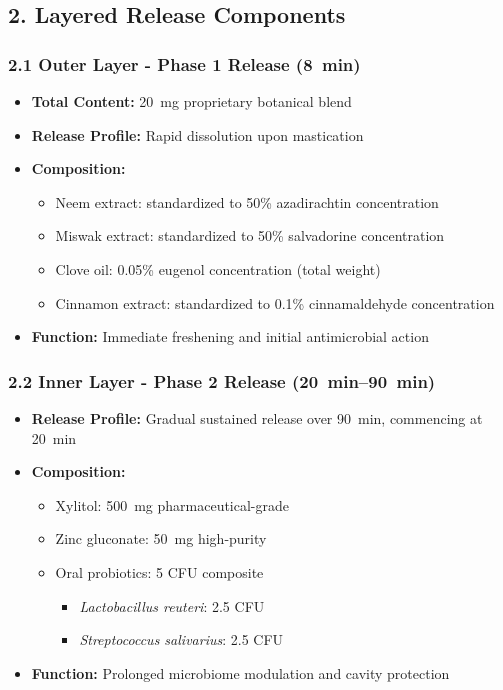 \documentclass[12pt]{article}
\begin{document}
\subsection*{2. Layered Release Components}

\subsubsection*{2.1 Outer Layer - Phase 1 Release (\SI{8}{\minute})}
\begin{itemize}
    \item \textbf{Total Content:} \SI{20}{\milli\gram} proprietary botanical blend
    \item \textbf{Release Profile:} Rapid dissolution upon mastication
    \item \textbf{Composition:}
    \begin{itemize}
        \item Neem extract: standardized to 50\% azadirachtin concentration
        \item Miswak extract: standardized to 50\% salvadorine concentration
        \item Clove oil: 0.05\% eugenol concentration (total weight)
        \item Cinnamon extract: standardized to 0.1\% cinnamaldehyde concentration
    \end{itemize}
    \item \textbf{Function:} Immediate freshening and initial antimicrobial action
\end{itemize}

\subsubsection*{2.2 Inner Layer - Phase 2 Release (\SIrange{20}{90}{\minute})}
\begin{itemize}
    \item \textbf{Release Profile:} Gradual sustained release over \SI{90}{\minute}, commencing at \SI{20}{\minute}
    \item \textbf{Composition:}
    \begin{itemize}
        \item Xylitol: \SI{500}{\milli\gram} pharmaceutical-grade
        \item Zinc gluconate: \SI{50}{\milli\gram} high-purity
        \item Oral probiotics: \SI{5}{\billion} CFU composite
        \begin{itemize}
            \item \textit{Lactobacillus reuteri}: \SI{2.5}{\billion} CFU
            \item \textit{Streptococcus salivarius}: \SI{2.5}{\billion} CFU
        \end{itemize}
    \end{itemize}
    \item \textbf{Function:} Prolonged microbiome modulation and cavity protection
\end{itemize}
\end{document}

